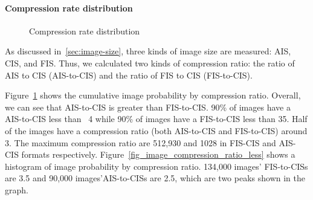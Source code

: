 \paragraph{Compression rate distribution}

\begin{figure}[!t]
	\centering
	\caption{Compression rate distribution}
	\label{fig-image-compression-ratio}
\end{figure}

As discussed in~\ref{sec:image-size}, three kinds of image size are measured: AIS, CIS, and FIS. Thus, we calculated two kinds of compression ratio: the ratio of AIS to CIS (AIS-to-CIS) and the ratio of FIS to CIS (FIS-to-CIS). 

Figure~\ref{fig-image-compression-ratio} shows the cumulative image probability by compression ratio. Overall, we can see that AIS-to-CIS is greater than FIS-to-CIS. 90\% of images have a AIS-to-CIS less than ~4 while 90\% of images have a FIS-to-CIS less than 35. Half of the images have a compression ratio (both AIS-to-CIS and FIS-to-CIS) around 3. The maximum compression ratio are 512,930 and 1028 in FIS-CIS and AIS-CIS formats respectively.
Figure~\ref{fig_image_compression_ratio_less} shows a histogram of image probability by compression ratio. 134,000 images' FIS-to-CISs are 3.5 and 90,000 images'AIS-to-CISs are 2.5, which are two peaks shown in the graph.

